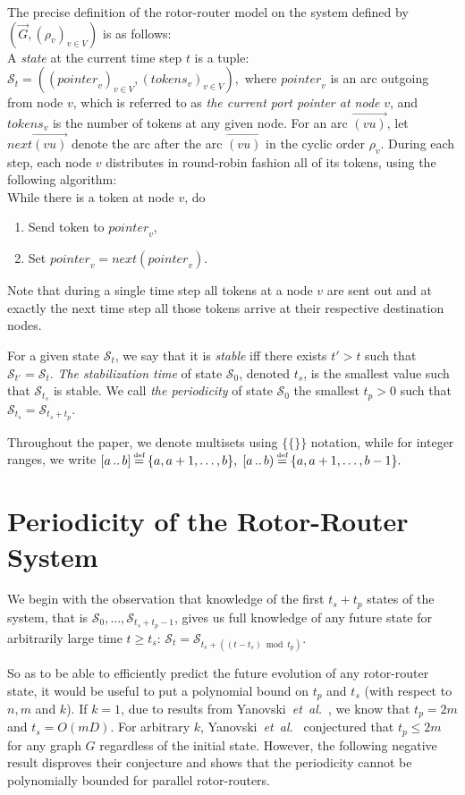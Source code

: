 \documentclass{article}[11pt,letter]
\newcommand{\state}{\mathcal{S}}
\newcommand{\mset}[1]{\{\!\{#1\}\!\}}
\newcommand{\closedrange}[2]{[#1\,..\,#2]}
\newcommand{\halfrange}[2]{[#1\,..\,#2)}
\newcommand\defeq{\stackrel{\mathclap{\normalfont{\mbox{\text{\tiny{def}}}}}}{=}}
\newcommand{\stab}{t_{s}}
\newcommand{\per}{t_{p}}
\newcommand{\etal}{{\it et~al.}}
\newcommand{\tokens}{\mathit{tokens}}
\newcommand{\pointer}{\mathit{pointer}}
\begin{document}
The precise definition of the rotor-router model on the system defined by $(\vec{G},(\rho_v)_{v\in V})$ is as follows:\\ A \emph{state} at the current time step  $t$ is a tuple:
$\state_t = ((\pointer_v)_{v \in V},(\tokens_v)_{v \in V}),$
where $\pointer_v$ is an arc outgoing from node $v$, which is referred to as \emph{the current port pointer at node} $v$, and $\tokens_v$ is the number of tokens at any given node.  For an arc $\vec{(vu)}$, let $\mathit{next}\vec{(vu)}$ denote the arc after the arc $\vec{(vu)}$ in the cyclic order $\rho_v$.
During each step, each node $v$ distributes in round-robin fashion all of its tokens, using the following algorithm:\\[2mm]
\enlargethispage{5mm}
While there is a token at node $v$, do
\begin{enumerate}
\item Send token to $\pointer_v$,
\item Set $\pointer_v = \mathit{next}(\pointer_v)$.
\end{enumerate}
Note that during a single time step all tokens at a node $v$ are sent out and at exactly the next time step all those tokens arrive at their respective destination nodes.

For a given state $\state_t$, we say that it is \emph{stable} iff there exists $t' > t$ such that $\state_{t'} = \state_t$.
\emph{The stabilization time} of state $\state_0$, denoted $\stab$, is the smallest value such that $\state_{\stab}$ is stable.
We call \emph{the periodicity} of state $\state_0$ the smallest $\per>0$ such that $\state_{\stab} = \state_{\stab+\per}$.


Throughout the paper, we denote multisets using $\mset{}$ notation, while for integer ranges, we write $\closedrange{a}{b} \defeq \{a,a+1,\ldots,b\},$ $\halfrange{a}{b} \defeq \{a,a+1,\ldots,b-1\}.$

\section{Periodicity of the Rotor-Router System}
\label{sec:lock-in}



We begin with the observation that knowledge of the first $\stab+\per$ states of the system, that is $\state_0,\ldots,\state_{\stab+\per-1}$, gives us full knowledge of any future state for arbitrarily large time $t\ge \stab$:
$\state_t = \state_{\stab + ((t - \stab) \bmod \per)}.$

So as to be able to efficiently predict the future evolution of any rotor-router state, it would be useful to put a polynomial bound on $\per$ and $\stab$ (with respect to $n,m$ and $k$). If $k=1$, due to results from Yanovski~\etal~\cite{YanovskiWB03}, we know that $\per = 2m$ and $\stab = O(mD)$.
For arbitrary $k$, Yanovski~\etal~\cite{YanovskiWB03} conjectured that $\per \le 2m$ for any graph $G$ regardless of the initial state.
However, the following negative result disproves their conjecture and shows that the periodicity cannot be polynomially bounded for parallel rotor-routers.
\end{document}
